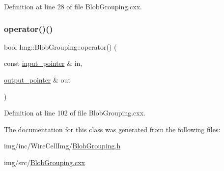 Definition at line 28 of file Blob\+Grouping.\+cxx.

\mbox{\label{class_wire_cell_1_1_img_1_1_blob_grouping_a88167a4eac6c6c97c550a11cc6a0e093}} 
\subsubsection{\texorpdfstring{operator()()}{operator()()}}
{\footnotesize\ttfamily bool Img\+::\+Blob\+Grouping\+::operator() (\begin{DoxyParamCaption}\item[{const \hyperlink{class_wire_cell_1_1_i_function_node_a55c0946156df9b712b8ad1a0b59b2db6}{input\+\_\+pointer} \&}]{in,  }\item[{\hyperlink{class_wire_cell_1_1_i_function_node_afc02f1ec60d31aacddf64963f9ca650b}{output\+\_\+pointer} \&}]{out }\end{DoxyParamCaption})\hspace{0.3cm}{\ttfamily [virtual]}}



Definition at line 102 of file Blob\+Grouping.\+cxx.



The documentation for this class was generated from the following files\+:\begin{DoxyCompactItemize}
\item 
img/inc/\+Wire\+Cell\+Img/\hyperlink{_blob_grouping_8h}{Blob\+Grouping.\+h}\item 
img/src/\hyperlink{_blob_grouping_8cxx}{Blob\+Grouping.\+cxx}\end{DoxyCompactItemize}
